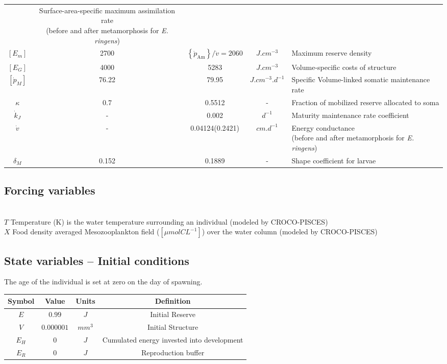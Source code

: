\begin{table}[H]
\begin{adjustbox}{width=1.2\textwidth}
\begin{tabular}{c|c|c|c|l}
	& \makecell[l]{Surface-area-specific maximum assimilation rate \\ (before and after metamorphosis for \textit{E. ringens})} \\
$\left[ E_{m} \right]$ 
	& 2700
	& $\left \{ \dot{p}_\mathrm{Am} \right \}/\dot{v}=2060$
	& $J.cm^{-3}$ & Maximum reserve density\\
$\left[ E_{G} \right]$
	& 4000
	& 5283
	& $J.cm^{-3}$ & Volume-specific costs of structure\\
$\left [ \dot{p}_{M} \right ]$
	& 76.22
	& 79.95
	& $J.cm^{-3}.d^{-1}$
	& Specific Volume-linked somatic maintenance rate\\
$\kappa$
	& 0.7 
	& 0.5512 
	& - 
	& Fraction of mobilized reserve allocated to soma\\
$\dot{k}_{J}$ & - & 0.002 	        & $d^{-1}$     & Maturity maintenance rate coefficient\\
$\dot{v}$
	& - & 0.04124(0.2421)
	& $cm. d^{-1}$ 
	& \makecell[l]{Energy conductance \\ (before and after metamorphosis for \textit{E. ringens})}\\
$\delta_{M}$
	& 0.152
	& 0.1889
	& -
	& Shape coefficient for larvae\\
\end{tabular}
\end{adjustbox}
\end{table}


\subsection*{Forcing variables}
\hfill \\

$T$ Temperature (K) is the water temperature surrounding an individual (modeled by CROCO-PISCES)\\

$X$ Food density averaged Mesozooplankton field ($\left[ \mu mol CL^{-1} \right]$) over the water column (modeled by CROCO-PISCES)\\

\subsection*{State variables – Initial conditions}

The age of the individual is set at zero on the day of spawning.\\

\begin{tabular}{|c|c|c|c|}
\hline 
Symbol  & Value      & Units  & Definition      \\ 
\hline 
$E$     & $0.99$     & $J$    & Initial Reserve \\ 
$V$     & $0.000001$ & $mm^3$ & Initial Structure\\
$E_{H}$ & $0$ 		  & $J$    & Cumulated energy invested into development\\
$E_{R}$ & $0$         & $J$   & Reproduction buffer\\
\hline 
\end{tabular}

